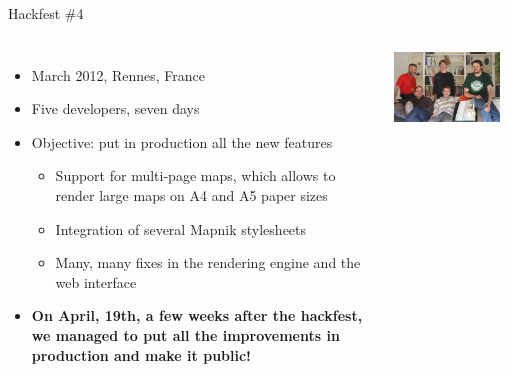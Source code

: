 \documentclass{beamer}
\begin{document}
\begin{frame}{Hackfest \#4}
  \begin{columns}
  \begin{itemize}
  \item March 2012, Rennes, France
  \item Five developers, seven days
  \item Objective: put in production all the new features
    \begin{itemize}
    \item Support for multi-page maps, which allows to render large
      maps on A4 and A5 paper sizes
    \item Integration of several Mapnik stylesheets
    \item Many, many fixes in the rendering engine and the web
      interface
    \end{itemize}
  \item {\bf On April, 19th, a few weeks after the hackfest, we
      managed to put all the improvements in production and make it
      public!}
  \end{itemize}
  \includegraphics[width=0.9\textwidth]{hackfest-4.jpg}
  \end{columns}
\end{frame}
\end{document}
